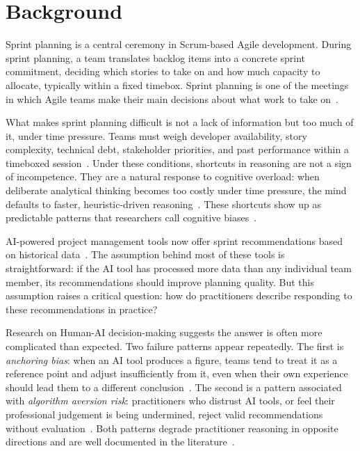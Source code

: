 \documentclass[a4paper,twoside]{bth}
\begin{document}
\section{Background}

Sprint planning is a central ceremony in Scrum-based Agile development. During sprint planning, a team translates backlog items into a concrete sprint commitment, deciding which stories to take on and how much capacity to allocate, typically within a fixed timebox. Sprint planning is one of the meetings in which Agile teams make their main decisions about what work to take on~\cite{drury2013investigation}.

What makes sprint planning difficult is not a lack of information but too much of it, under time pressure. Teams must weigh developer availability, story complexity, technical debt, stakeholder priorities, and past performance within a timeboxed session~\cite{kula2024context, dybaa2008empirical}. Under these conditions, shortcuts in reasoning are not a sign of incompetence. They are a natural response to cognitive overload: when deliberate analytical thinking becomes too costly under time pressure, the mind defaults to faster, heuristic-driven reasoning~\cite[pp.~20--24]{kahneman2011thinking}. These shortcuts show up as predictable patterns that researchers call cognitive biases~\cite{borowa2023fixations, mohanani2018cognitive}.

AI-powered project management tools now offer sprint recommendations based on historical data~\cite{angara2020devops}. The assumption behind most of these tools is straightforward: if the AI tool has processed more data than any individual team member, its recommendations should improve planning quality. But this assumption raises a critical question: how do practitioners describe responding to these recommendations in practice?

Research on Human-AI decision-making suggests the answer is often more complicated than expected. Two failure patterns appear repeatedly. The first is \textit{anchoring bias}: when an AI tool produces a figure, teams tend to treat it as a reference point and adjust insufficiently from it, even when their own experience should lead them to a different conclusion~\cite{mohanani2018cognitive}\cite[pp.~119--128]{kahneman2011thinking}. The second is a pattern associated with \textit{algorithm aversion risk}: practitioners who distrust AI tools, or feel their professional judgement is being undermined, reject valid recommendations without evaluation~\cite{dietvorst2015algorithm}. Both patterns degrade practitioner reasoning in opposite directions and are well documented in the literature~\cite{mohanani2018cognitive, dietvorst2015algorithm}.
\end{document}
